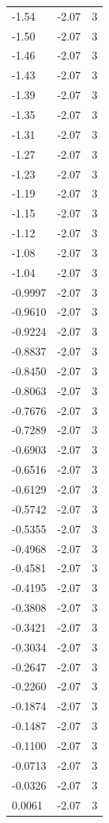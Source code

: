 \begin{longtable}{lrr}
  -1.54 & -2.07 & 3 \\
  -1.50 & -2.07 & 3 \\
  -1.46 & -2.07 & 3 \\
  -1.43 & -2.07 & 3 \\
  -1.39 & -2.07 & 3 \\
  -1.35 & -2.07 & 3 \\
  -1.31 & -2.07 & 3 \\
  -1.27 & -2.07 & 3 \\
  -1.23 & -2.07 & 3 \\
  -1.19 & -2.07 & 3 \\
  -1.15 & -2.07 & 3 \\
  -1.12 & -2.07 & 3 \\
  -1.08 & -2.07 & 3 \\
  -1.04 & -2.07 & 3 \\
  -0.9997 & -2.07 & 3 \\
  -0.9610 & -2.07 & 3 \\
  -0.9224 & -2.07 & 3 \\
  -0.8837 & -2.07 & 3 \\
  -0.8450 & -2.07 & 3 \\
  -0.8063 & -2.07 & 3 \\
  -0.7676 & -2.07 & 3 \\
  -0.7289 & -2.07 & 3 \\
  -0.6903 & -2.07 & 3 \\
  -0.6516 & -2.07 & 3 \\
  -0.6129 & -2.07 & 3 \\
  -0.5742 & -2.07 & 3 \\
  -0.5355 & -2.07 & 3 \\
  -0.4968 & -2.07 & 3 \\
  -0.4581 & -2.07 & 3 \\
  -0.4195 & -2.07 & 3 \\
  -0.3808 & -2.07 & 3 \\
  -0.3421 & -2.07 & 3 \\
  -0.3034 & -2.07 & 3 \\
  -0.2647 & -2.07 & 3 \\
  -0.2260 & -2.07 & 3 \\
  -0.1874 & -2.07 & 3 \\
  -0.1487 & -2.07 & 3 \\
  -0.1100 & -2.07 & 3 \\
  -0.0713 & -2.07 & 3 \\
  -0.0326 & -2.07 & 3 \\
  0.0061 & -2.07 & 3 \\

\end{longtable}

